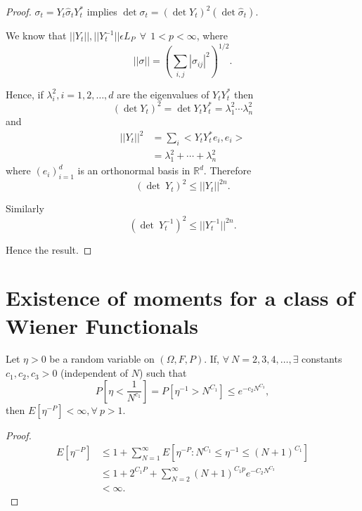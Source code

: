 \begin{proof}
  $\sigma_t=Y_t \hat{\sigma}_t Y_t^*$
  implies $\det \sigma_t=(\det Y_t)^2(\det  \hat{\sigma}_t)$.
  
  We know that $|| Y_t ||, || Y_t^{-1} || \epsilon  L_P~ ~\forall~ ~1
  < p < \infty$, where 
  $$
  || \sigma ||= \left(\sum_{i,j}| \sigma_{ij}|^2\right)^{1/2}.
  $$

  Hence, if $\lambda_i^2, i =1,2, \ldots, d$ are the eigenvalues of $Y_tY_t^*$
  then
  $$
  (\det Y_t)^2=\det Y_t Y_t^*=\lambda_1^2 \cdots \lambda_n^2
  $$
  and
  \begin{align*}
    || Y_t ||^2 &=\sum_i <Y_t Y_t^* e_i,e_i >\\
    &=\lambda_1^2+ \cdots +\lambda_n^2
  \end{align*}
  where $(e_i)^d_{i=1}$ is an orthonormal basis in $\mathbb{R}^d$. Therefore
  $$
  (\det ~ Y_t)^2 \leq || Y_t ||^{2n}.
  $$

  Similarly
  $$
  (\det~Y_t^{-1})^2 \leq || Y_t^{-1}||^{2n}.
  $$
  
  Hence the result.
\end{proof}

\section[Existence of moments for a class of Wiener
  Functionals]{Existence of moments for a class of Wiener\hfill\break
  Functionals}%


\begin{proposition}%
  Let $\eta>0$ be a random variable on $(\Omega, F, P)$. If,
  $\forall~N=2,3,4,\ldots,\exists $ constants $c_1, c_2, c_3 > 0$
  (independent of $N$) such that 
  $$
  P\left[\eta < \frac{1}{N^{c_1}}\right]=P\left[\eta^{-1}>N^{C_1}\right]
  \leq e^{-c_2N^{C_3}}, 
  $$
  then \quad $E[\eta^{-P}]< \infty, \forall~p > 1$.
\end{proposition}

\begin{proof}
  \begin{align*}
    E \left[\eta^{-P}\right] & \leq 1+\sum_{N=1}^{\infty} E
    \left[\eta^{-P}: N^{C_1} \leq \eta^{-1}\leq (N+1)^{C_{1}}\right]\\ 
    & \leq 1+2^{C_1P}+\sum_{N=2}^{\infty}(N+1)^{C_1p} e^{-C_2 N^{C_3}}\\
    & < \infty.
  \end{align*}\pageoriginale
\end{proof}

